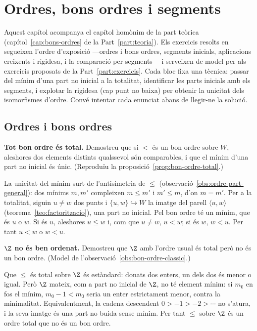 \chapter{Ordres, bons ordres i segments}\label{cap:practica-bons-ordres}

Aquest capítol acompanya el capítol homònim de la part teòrica (capítol~\ref{cap:bons-ordres} de la Part~\ref{part:teoria}). Els exercicis resolts en segueixen l'ordre d'exposició ---ordres i bons ordres, segments inicials, aplicacions creixents i rigidesa, i la comparació per segments--- i serveixen de model per als exercicis proposats de la Part~\ref{part:exercicis}. Cada bloc fixa una tècnica: passar del mínim d'una part no inicial a la totalitat, identificar les parts inicials amb els segments, i explotar la rigidesa (cap punt no baixa) per obtenir la unicitat dels isomorfismes d'ordre. Convé intentar cada enunciat abans de llegir-ne la solució.

\section{Ordres i bons ordres}\label{prac:ordres}

\begin{exercici}
\textbf{Tot bon ordre és total.} Demostreu que si \({<}\) és un bon ordre sobre \(W\), aleshores dos elements distints qualssevol són comparables, i que el mínim d'una part no inicial és únic. (Reproduïu la proposició~\ref{prop:bon-ordre-total}.)
\end{exercici}
\begin{solucio}
La unicitat del mínim surt de l'antisimetria de \(\le\) (observació~\ref{obs:ordre-part-general}): dos mínims \(m,m'\) compleixen \(m\le m'\) i \(m'\le m\), d'on \(m=m'\). Per a la totalitat, siguin \(u\ne w\) dos punts i \(\{u,w\}\hookrightarrow W\) la imatge del parell \(\langle u,w\rangle\) (teorema~\ref{teo:factoritzacio}), una part no inicial. Pel bon ordre té un mínim, que és \(u\) o \(w\). Si és \(u\), aleshores \(u\le w\) i, com que \(u\ne w\), \(u<w\); si és \(w\), \(w<u\). Per tant \(u<w\) o \(w<u\).
\end{solucio}

\begin{exercici}
\textbf{\(\Z\) no és ben ordenat.} Demostreu que \(\Z\) amb l'ordre usual és total però no és un bon ordre. (Model de l'observació~\ref{obs:bon-ordre-classic}.)
\end{exercici}
\begin{solucio}
Que \(\le\) és total sobre \(\Z\) és estàndard: donats dos enters, un dels dos és menor o igual. Però \(\Z\) mateix, com a part no inicial de \(\Z\), no té element mínim: si \(m_0\) en fos el mínim, \(m_0-1<m_0\) seria un enter estrictament menor, contra la minimalitat. Equivalentment, la cadena descendent \(0>-1>-2>\cdots\) no s'atura, i la seva imatge és una part no buida sense mínim. Per tant \(\le\) sobre \(\Z\) és un ordre total que no és un bon ordre.
\end{solucio}

